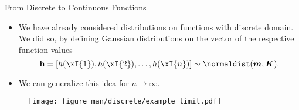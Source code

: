 \begin{frame}[c]{From Discrete to Continuous Functions}

\begin{itemize}
  \item We have already considered distributions on functions with discrete domain. We did so, by defining Gaussian distributions on the vector of the respective function values $$\mathbf{h} = [h(\xI{1}), h(\xI{2}),\dots, h(\xI{n})] \sim \normaldist(\bm{m}, \bm{K}).$$
  \item We can generalize this idea for $n \to \infty$.
\end{itemize}

\begin{figure}
    \texttt{[image: figure\_man/discrete/example\_limit.pdf]}
  \end{figure}
\end{frame}

